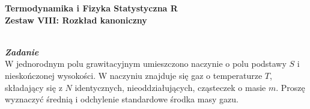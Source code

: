 \documentclass[11pt,a4paper]{article}
\newcounter{zadanie}\newcommand{\zadanie}[1][]{\addtocounter{zadanie}{1} ~\\  {\bf \emph{Zadanie \arabic{zadanie} #1 }} \\}
\begin{document}
   

\begin{centering}
  {\bf {\Large
  Termodynamika i Fizyka Statystyczna R \\
  Zestaw VIII: Rozkład kanoniczny
  }} \\  
\end{centering}

\vspace{1cm}

\zadanie[]

W jednorodnym polu grawitacyjnym umieszczono naczynie o polu podstawy $S$ i
nieskończonej wysokości. W naczyniu znajduje się gaz o temperaturze $T$,
składający się z $N$ identycznych,  nieoddziałujących, cząsteczek o 
masie $m$. Proszę wyznaczyć średnią i odchylenie standardowe
środka masy gazu.
\end{document}

